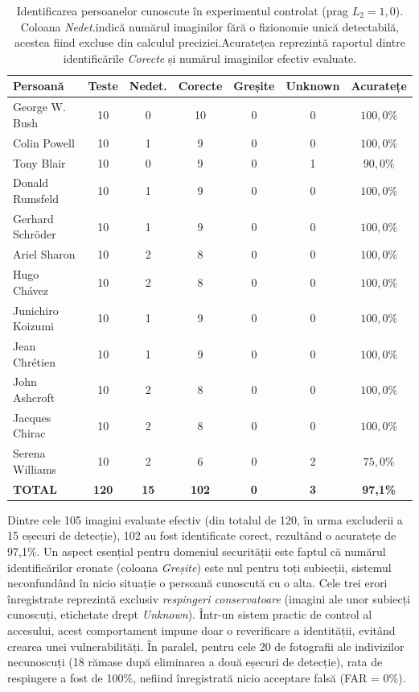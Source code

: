 \documentclass[../../main.tex]{subfiles}
\begin{document}
\begin{table}[h]
    \centering
    \caption{Identificarea persoanelor cunoscute în experimentul controlat (prag $L_2 = 1{,}0$).
    Coloana \textit{Nedet.}indică numărul imaginilor fără o fizionomie unică detectabilă, acestea fiind excluse din calculul preciziei.Acuratețea reprezintă raportul dintre identificările \textit{Corecte} și numărul imaginilor efectiv evaluate.}
    \label{tab:facial_controlat}
    \begin{tabular}{l c c c c c c}
        \hline
        \textbf{Persoană} & \textbf{Teste} & \textbf{Nedet.} & \textbf{Corecte} &
        \textbf{Greșite} & \textbf{Unknown} & \textbf{Acuratețe} \\
        \hline
        George W. Bush      & 10 & 0 & 10 & 0 & 0 & $100{,}0\%$ \\
        Colin Powell        & 10 & 1 & 9  & 0 & 0 & $100{,}0\%$ \\
        Tony Blair          & 10 & 0 & 9  & 0 & 1 & $90{,}0\%$  \\
        Donald Rumsfeld     & 10 & 1 & 9  & 0 & 0 & $100{,}0\%$ \\
        Gerhard Schröder    & 10 & 1 & 9  & 0 & 0 & $100{,}0\%$ \\
        Ariel Sharon        & 10 & 2 & 8  & 0 & 0 & $100{,}0\%$ \\
        Hugo Chávez         & 10 & 2 & 8  & 0 & 0 & $100{,}0\%$ \\
        Junichiro Koizumi   & 10 & 1 & 9  & 0 & 0 & $100{,}0\%$ \\
        Jean Chrétien       & 10 & 1 & 9  & 0 & 0 & $100{,}0\%$ \\
        John Ashcroft       & 10 & 2 & 8  & 0 & 0 & $100{,}0\%$ \\
        Jacques Chirac      & 10 & 2 & 8  & 0 & 0 & $100{,}0\%$ \\
        Serena Williams     & 10 & 2 & 6  & 0 & 2 & $75{,}0\%$  \\
        \hline
        \textbf{TOTAL}      & \textbf{120} & \textbf{15} & \textbf{102} & \textbf{0} &
        \textbf{3} & \textbf{97{,}1\%} \\
        \hline
    \end{tabular}
\end{table}


Dintre cele 105 imagini evaluate efectiv (din totalul de 120, în urma excluderii a 15 eșecuri de detecție), 102 au fost identificate corect, rezultând o acuratețe de 97,1\%. Un aspect esențial pentru domeniul securității este faptul că numărul identificărilor eronate (coloana \textit{Greșite}) este nul pentru toți subiecții, sistemul neconfundând în nicio situație o persoană cunoscută cu o alta. Cele trei erori înregistrate reprezintă exclusiv \textit{respingeri conservatoare} (imagini ale unor subiecți cunoscuți, etichetate drept \textit{Unknown}). Într-un sistem practic de control al accesului, acest comportament impune doar o reverificare a identității, evitând crearea unei vulnerabilități. În paralel, pentru cele 20 de fotografii ale indivizilor necunoscuți (18 rămase după eliminarea a două eșecuri de detecție), rata de respingere a fost de 100\%, nefiind înregistrată nicio acceptare falsă (FAR = 0\%).
\end{document}
